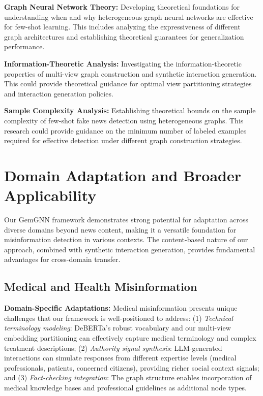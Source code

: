 \textbf{Graph Neural Network Theory:} Developing theoretical foundations for understanding when and why heterogeneous graph neural networks are effective for few-shot learning. This includes analyzing the expressiveness of different graph architectures and establishing theoretical guarantees for generalization performance.

\textbf{Information-Theoretic Analysis:} Investigating the information-theoretic properties of multi-view graph construction and synthetic interaction generation. This could provide theoretical guidance for optimal view partitioning strategies and interaction generation policies.

\textbf{Sample Complexity Analysis:} Establishing theoretical bounds on the sample complexity of few-shot fake news detection using heterogeneous graphs. This research could provide guidance on the minimum number of labeled examples required for effective detection under different graph construction strategies.

\section{Domain Adaptation and Broader Applicability}

Our GemGNN framework demonstrates strong potential for adaptation across diverse domains beyond news content, making it a versatile foundation for misinformation detection in various contexts. The content-based nature of our approach, combined with synthetic interaction generation, provides fundamental advantages for cross-domain transfer.

\subsection{Medical and Health Misinformation}

\textbf{Domain-Specific Adaptations:} Medical misinformation presents unique challenges that our framework is well-positioned to address: (1) \emph{Technical terminology modeling}: DeBERTa's robust vocabulary and our multi-view embedding partitioning can effectively capture medical terminology and complex treatment descriptions; (2) \emph{Authority signal synthesis}: LLM-generated interactions can simulate responses from different expertise levels (medical professionals, patients, concerned citizens), providing richer social context signals; and (3) \emph{Fact-checking integration}: The graph structure enables incorporation of medical knowledge bases and professional guidelines as additional node types.

